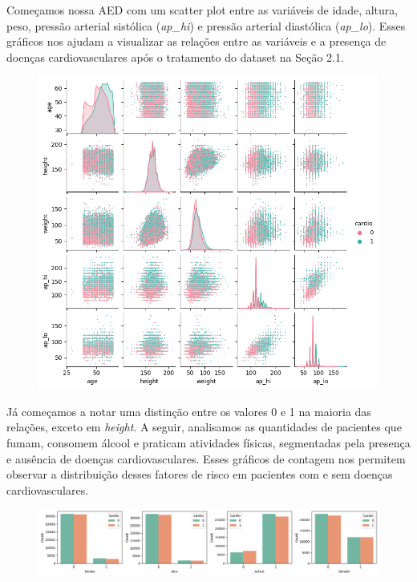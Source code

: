 \documentclass[article,11pt,a4paper,brazil]{abntex2}
\begin{document}
	Começamos nossa AED com um scatter plot entre as variáveis de idade, altura, peso, pressão arterial sistólica (\textit{ap\_hi}) e pressão arterial diastólica (\textit{ap\_lo}). Esses gráficos nos ajudam a visualizar as relações entre as variáveis e a presença de doenças cardiovasculares após o tratamento do dataset na Seção 2.1.
	
	\begin{figure}[H]
		\centering
		\includegraphics[width=0.8\linewidth]{Images/pairplot.png}
	\end{figure}
	
	Já começamos a notar uma distinção entre os valores 0 e 1 na maioria das relações, exceto em \textit{height}. A seguir, analisamos as quantidades de pacientes que fumam, consomem álcool e praticam atividades físicas, segmentadas pela presença e ausência de doenças cardiovasculares. Esses gráficos de contagem nos permitem observar a distribuição desses fatores de risco em pacientes com e sem doenças cardiovasculares.
	
	\begin{figure}[H]
		\centering
		\includegraphics[width=1\linewidth]{Images/categorical1.png}
	\end{figure}
	
\end{document}
